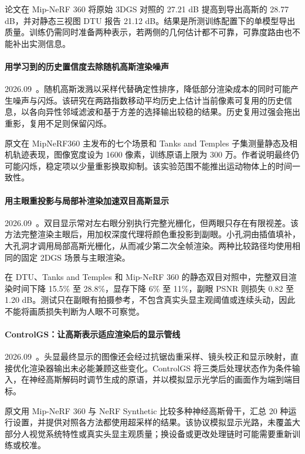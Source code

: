 论文在 Mip-NeRF 360 将原始 3DGS 对照的 27.21 dB 提高到导出高斯的 28.77 dB，并对静态三视图 DTU 报告 21.12 dB。结果是所测训练配置下的单模型导出质量。训练仍需同时准备两种表示，若两侧的几何估计都不可靠，可靠度路由也不能补出实测信息。

\paragraph{用学习到的历史置信度去除随机高斯渲染噪声}
2026.09~\cite{2609_25604}。随机高斯泼溅以采样代替确定性排序，降低部分渲染成本的同时可能产生噪声与闪烁。该研究在两路指数移动平均历史上估计当前像素可复用的历史信息，以各向异性邻域滤波和基于方差的选择输出较稳的结果。历史复用过强会拖出重影，复用不足则保留闪烁。

原文在 MipNeRF360 主发布的七个场景和 Tanks and Temples 子集测量静态及相机轨迹表现，图像宽度设为 1600 像素，训练原语上限为 300 万。作者说明最终仍可能闪烁，稳定项以少量重影换取抑制。该实验范围不能推出运动物体上的时间一致性。

\paragraph{用主眼重投影与局部补渲染加速双目高斯显示}
2026.09~\cite{2609_30741}。双目显示常对左右眼分别执行完整光栅化，但两眼只存在有限视差。该方法完整渲染主眼后，用加权深度代理将颜色重投影到副眼。小孔洞由插值填补，大孔洞才调用局部高斯光栅化，从而减少第二次全帧渲染。两种比较路径均使用相同的固定 2DGS 场景与主眼渲染。

在 DTU、Tanks and Temples 和 Mip-NeRF 360 的静态双目对照中，完整双目渲染时间下降 15.5\% 至 28.8\%，显存下降 6\% 至 11\%，副眼 PSNR 则损失 0.82 至 1.20 dB。测试只在副眼有拍摄参考，不包含真实头显主观阈值或连续头动，因此不能将画质损失判断为人眼不可察觉。

\paragraph{ControlGS：让高斯表示适应渲染后的显示管线}
2026.09~\cite{2609_32038}。头显最终显示的图像还会经过抗锯齿重采样、镜头校正和显示映射，直接优化渲染器输出未必能兼顾这些变化。ControlGS 将三类后处理状态作为条件输入，在神经高斯解码时调节生成的原语，并以模拟显示光学后的画面作为端到端目标。

原文用 Mip-NeRF 360 与 NeRF Synthetic 比较多种神经高斯骨干，汇总 20 种运行设置，并提供对照各方法都使用超采样的结果。该协议模拟显示光路，未覆盖大部分人视觉系统特性或真实头显主观质量；换设备或更改处理链时可能需要重新训练或校准。

